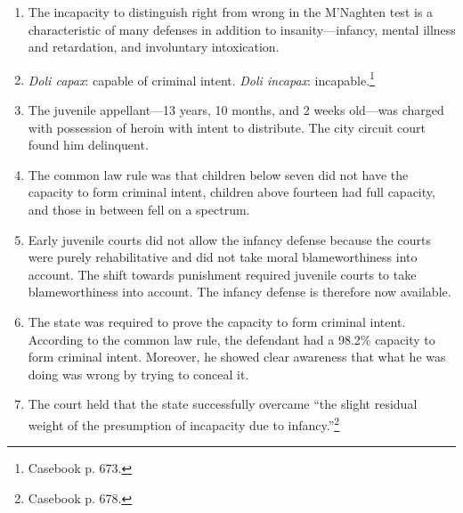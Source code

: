 \begin{enumerate}
    \item The incapacity to distinguish right from wrong in the M'Naghten test 
    is a characteristic of many defenses in addition to insanity---infancy, 
    mental illness and retardation, and involuntary intoxication.
    \item \emph{Doli capax}: capable of criminal intent. \emph{Doli incapax}: 
    incapable.\footnote{Casebook p. 673.}
    \item The juvenile appellant---13 years, 10 months, and 2 weeks old---was 
    charged with possession of heroin with intent to distribute. The city 
    circuit court found him delinquent.
    \item The common law rule was that children below seven did not have the 
    capacity to form criminal intent, children above fourteen had full 
    capacity, and those in between fell on a spectrum.
    \item Early juvenile courts did not allow the infancy defense because the 
    courts were purely rehabilitative and did not take moral blameworthiness 
    into account. The shift towards punishment required juvenile courts to 
    take blameworthiness into account. The infancy defense is therefore now 
    available.
    \item The state was required to prove the capacity to form criminal 
    intent. According to the common law rule, the defendant had a 98.2\% 
    capacity to form criminal intent. Moreover, he showed clear awareness that 
    what he was doing was wrong by trying to conceal it.
    \item The court held that the state successfully overcame ``the slight 
    residual weight of the presumption of incapacity due to 
    infancy.''\footnote{Casebook p. 678.}
\end{enumerate}
